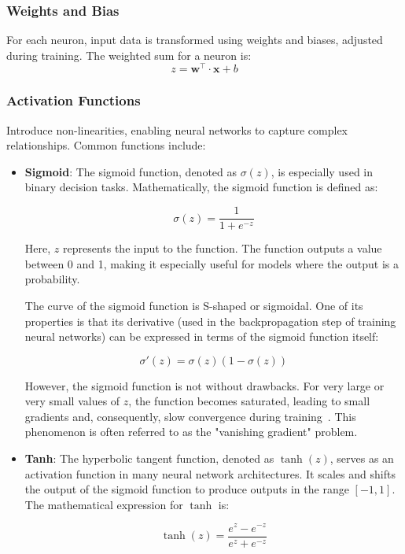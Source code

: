\subsubsection{Weights and Bias}

For each neuron, input data is transformed using weights and biases, adjusted during training. The weighted sum for a neuron is:
\[
z = \mathbf{w^\intercal} \cdot \mathbf{x} + b
\]

\subsubsection{Activation Functions}

Introduce non-linearities, enabling neural networks to capture complex relationships. Common functions include:

\begin{itemize}
	\item \textbf{Sigmoid}: 
The sigmoid function, denoted as \( \sigma(z) \), is especially used in binary decision tasks. Mathematically, the sigmoid function is defined as:

\[
\sigma(z) = \frac{1}{1 + e^{-z}}
\]

Here, \( z \) represents the input to the function. The function outputs a value between 0 and 1, making it especially useful for models where the output is a probability. 

The curve of the sigmoid function is S-shaped or sigmoidal. One of its properties is that its derivative (used in the backpropagation step of training neural networks) can be expressed in terms of the sigmoid function itself:

\[
\sigma'(z) = \sigma(z)(1 - \sigma(z))
\]

However, the sigmoid function is not without drawbacks. For very large or very small values of \( z \), the function becomes saturated, leading to small gradients and, consequently, slow convergence during training~\cite{glorot2010understanding}. This phenomenon is often referred to as the "vanishing gradient" problem.
	
	\item \textbf{Tanh}: 
The hyperbolic tangent function, denoted as \( \tanh(z) \), serves as an activation function in many neural network architectures. It scales and shifts the output of the sigmoid function to produce outputs in the range \([-1, 1]\). The mathematical expression for \( \tanh \) is:

\[
\tanh(z) = \frac{e^{z} - e^{-z}}{e^{z} + e^{-z}}
\]


\end{itemize}
